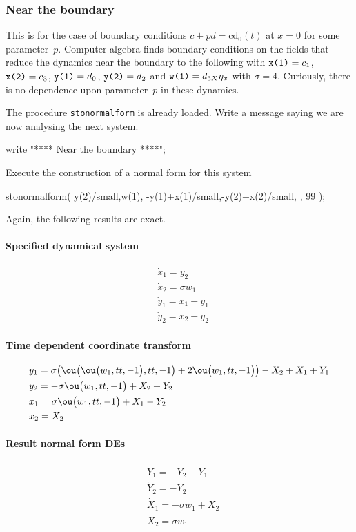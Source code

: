 \subsubsection{Near the boundary}
This is for the case of boundary conditions $c+pd=\text{cd}_0(t)$ at $x=0$ for some parameter~$p$.  
Computer algebra finds boundary conditions on the fields that reduce the dynamics near the boundary to the following with \(\verb|x(1)|=c_1\), \(\verb|x(2)|=c_3\), \(\verb|y(1)|=d_0\), \(\verb|y(2)|=d_2\) and \(\verb|w(1)|=d_{3X}\eta_x\) with \(\sigma=4\).
Curiously, there is no dependence upon parameter~$p$ in these dynamics.

The procedure \verb|stonormalform| is already loaded.
Write a message saying we are now analysing the next system.
\begin{reduce}
write "**** Near the boundary ****";
\end{reduce}
Execute the construction of a normal form for this system
\begin{reduce}
stonormalform(
    {y(2)/small,w(1)},
    {-y(1)+x(1)/small,-y(2)+x(2)/small},
    { },
    99 );
\end{reduce}
Again, the following results are exact.

\paragraph{Specified dynamical system}
\begin{align*}&
\dot x_{1}=y_{2}
\\&
\dot x_{2}=\sigma  w_{1}
\\&
\dot y_{1}=x_{1}-y_{1}
\\&
\dot y_{2}=x_{2}-y_{2}
\end{align*}

\paragraph{Time dependent coordinate transform}
\begin{align*}&
y_{1}=\sigma  \big(\ou\big(\ou\big(w_{1},tt,-1\big),tt,-1\big)+2 \ou
\big(w_{1},tt,-1\big)\big)-X_{2}+X_{1}+Y_{1}
\\&
y_{2}=-\sigma  \ou\big(w_{1},tt,-1\big)+X_{2}+Y_{2}
\\&
x_{1}=\sigma  \ou\big(w_{1},tt,-1\big)+X_{1}-Y_{2}
\\&
x_{2}=X_{2}
\end{align*}


\paragraph{Result normal form DEs}
\begin{align*}&
\dot Y_{1}=-Y_{2}-Y_{1}
\\&
\dot Y_{2}=-Y_{2}
\\&
\dot X_{1}=-\sigma  w_{1}+X_{2}
\\&
\dot X_{2}=\sigma  w_{1}
\end{align*}




